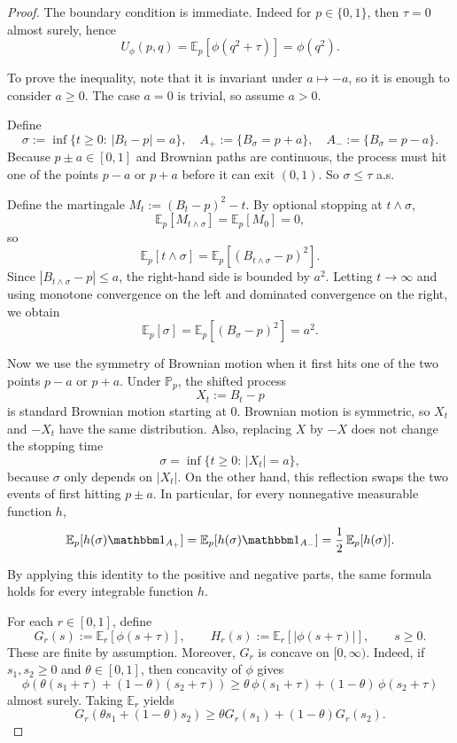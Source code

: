 \documentclass[11pt]{amsart}
\theoremstyle{definition}
\renewcommand{\1}{{\mathbbm{1}}}
\begin{document}
\begin{proof}
The boundary condition is immediate. Indeed for $p\in\{0,1\}$, then $\tau=0$ almost
surely, hence
\[
U_\phi(p,q)=\mathbb E_p[\phi(q^2+\tau)]=\phi(q^2).
\]

To prove the inequality, note that it is invariant under $a\mapsto -a$, so it
is enough to consider $a\ge 0$. The case $a=0$ is trivial, so assume $a>0$.

Define
\[
\sigma:=\inf\{t\ge 0:\,|B_t-p|=a\},
\quad
A_+:=\{B_\sigma=p+a\},
\quad
A_-:=\{B_\sigma=p-a\}.
\]
Because $p\pm a\in[0,1]$ and Brownian paths are continuous, the process must hit
one of the points $p-a$ or $p+a$ before it can exit $(0,1)$. So $\sigma\le \tau$ a.s.


Define the martingale $M_t:=(B_t-p)^2-t$.
By optional stopping at $t\wedge \sigma$,
\[
\mathbb E_p[M_{t\wedge \sigma}]=\mathbb E_p[M_0]=0,
\]
so
\[
\mathbb E_p[t\wedge \sigma]
=
\mathbb E_p[(B_{t\wedge \sigma}-p)^2].
\]
Since $|B_{t\wedge \sigma}-p|\le a$, the right-hand side is bounded by $a^2$.
Letting $t\to\infty$ and using monotone convergence on the left and dominated
convergence on the right, we obtain
\[
\mathbb E_p[\sigma]
=
\mathbb E_p[(B_\sigma-p)^2]
=
a^2.
\]

Now we use the symmetry of Brownian motion when it first hits one of the two
points $p-a$ or $p+a$. Under $\mathbb P_p$, the shifted process
\[
X_t:=B_t-p
\]
is standard Brownian motion starting at $0$. Brownian motion is symmetric, so
$X_t$ and $-X_t$ have the same distribution. Also, replacing $X$ by $-X$ does
not change the stopping time
\[
\sigma=\inf\{t\ge 0:\,|X_t|=a\},
\]
because $\sigma$ only depends on $|X_t|$. On the other hand, this reflection
swaps the two events of first hitting $p\pm a$. In particular, for every nonnegative measurable function
$h$,
\[
\mathbb E_p[h(\sigma)\mathbbm 1_{A_+}]
=
\mathbb E_p[h(\sigma)\mathbbm 1_{A_-}]
=
\frac12\,\mathbb E_p[h(\sigma)].
\]

By applying this identity to the positive and negative parts, the same formula
holds for every integrable function $h$.

For each $r\in[0,1]$, define
\[
G_r(s):=\mathbb E_r[\phi(s+\tau)],
\qquad
H_r(s):=\mathbb E_r[|\phi(s+\tau)|],
\qquad s\ge 0.
\]
These are finite by assumption. Moreover, $G_r$ is concave on $[0,\infty)$.
Indeed, if $s_1,s_2\ge 0$ and $\theta\in[0,1]$, then concavity of $\phi$ gives
\[
\phi\!\left(\theta(s_1+\tau)+(1-\theta)(s_2+\tau)\right)
\ge
\theta\,\phi(s_1+\tau)+(1-\theta)\,\phi(s_2+\tau)
\]
almost surely. Taking $\mathbb E_r$ yields
\[
G_r(\theta s_1+(1-\theta)s_2)
\ge
\theta G_r(s_1)+(1-\theta)G_r(s_2).
\]


\end{proof}
\end{document}
